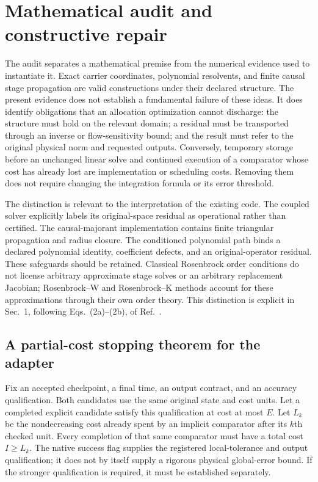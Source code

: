 
\section{Mathematical audit and constructive repair}
\label{sec:theory-audit}

The audit separates a mathematical premise from the numerical evidence used to
instantiate it.  Exact carrier coordinates, polynomial resolvents, and finite
causal stage propagation are valid constructions under their declared
structure.  The present evidence does not establish a fundamental failure of
these ideas.  It does identify obligations that an allocation optimization
cannot discharge: the structure must hold on the relevant domain; a residual
must be transported through an inverse or flow-sensitivity bound; and the
result must refer to the original physical norm and requested outputs.
Conversely, temporary storage before an unchanged linear solve and continued
execution of a comparator whose cost has already lost are implementation or
scheduling costs.  Removing them does not require changing the integration
formula or its error threshold.

The distinction is relevant to the interpretation of the existing code.
The coupled solver explicitly labels its original-space residual as
operational rather than certified.  The causal-majorant implementation
contains finite triangular propagation and radius closure.  The conditioned
polynomial path binds a declared polynomial identity, coefficient defects,
and an original-operator residual.  These safeguards should be retained.
Classical Rosenbrock order conditions do not license arbitrary approximate
stage solves or an arbitrary replacement Jacobian; Rosenbrock--W and
Rosenbrock--K methods account for these approximations through their own order
theory.  This distinction is explicit in Sec.~1, following Eqs.~(2a)--(2b), of
Ref.~\cite{TranquilliSandu2014}.

\subsection{A partial-cost stopping theorem for the adapter}
\label{subsec:cost-theorem}

Fix an accepted checkpoint, a final time, an output contract, and an accuracy
qualification.  Both candidates use the same original state and cost units.
Let a completed explicit candidate satisfy this qualification at cost at most
$E$.  Let $L_k$ be the nondecreasing cost already spent by an implicit
comparator after its $k$th checked unit.  Every completion of that same
comparator must have a total cost $I\geq L_k$.  The native success flag supplies
the registered local-tolerance and output qualification; it does not by itself
supply a rigorous physical global-error bound.  If the stronger qualification
is required, it must be established separately.

